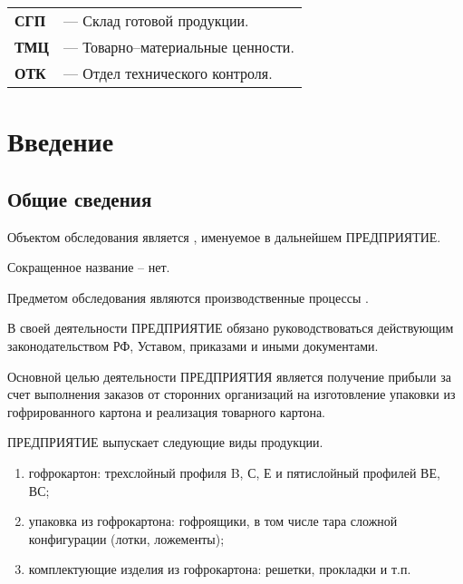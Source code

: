 \begin{tabular}{l l}

{\bf СГП}  & --- Склад готовой продукции.\\
{\bf ТМЦ}  & --- Товарно--материальные ценности.\\
{\bf ОТК}  & --- Отдел технического контроля.\\

\end{tabular}


\newpage

\chapter{Введение}

\section{Общие сведения}

Объектом обследования является \FIRMA, именуемое в дальнейшем ПРЕДПРИЯТИЕ.

Сокращенное название -- нет.

Предметом обследования являются производственные процессы \FIRMA. 


В своей деятельности ПРЕДПРИЯТИЕ обязано руководствоваться действующим законодательством РФ, Уставом, приказами и иными документами.

Основной целью деятельности ПРЕДПРИЯТИЯ является получение прибыли за счет выполнения заказов от сторонних организаций на изготовление упаковки из гофрированного картона и реализация товарного картона. 


ПРЕДПРИЯТИЕ выпускает следующие виды продукции.
\begin{enumerate}
    \item гофрокартон: трехслойный профиля B, С, Е и пятислойный профилей ВЕ, ВС;
	\item упаковка из гофрокартона: гофроящики, в том числе тара сложной конфигурации (лотки, ложементы);
	\item комплектующие изделия из гофрокартона: решетки, прокладки и т.п.
\end{enumerate}


